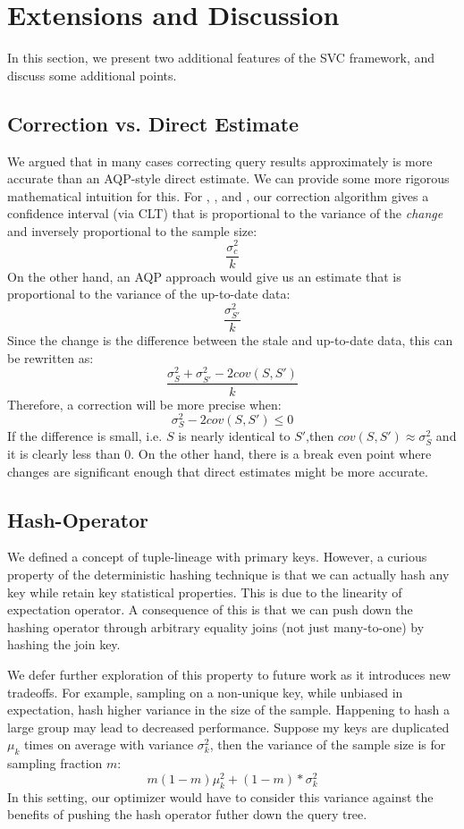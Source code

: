 
\section{Extensions and Discussion}\label{sec:ext}
In this section, we present two additional features of the SVC framework, and discuss some additional points.

\subsection{Correction vs. Direct Estimate}
We argued that in many cases correcting query results approximately is more accurate than an
AQP-style direct estimate. 
We can provide some more rigorous mathematical intuition for this.
For \sumfunc, \countfunc, and \avgfunc, our correction algorithm gives a confidence interval (via CLT) that is
proportional to the variance of the \emph{change} and inversely proportional to the sample size:
\[\frac{\sigma_{c}^2}{k}\]
On the other hand, an AQP approach would give us an estimate that is proportional to the variance of the up-to-date data:
\[\frac{\sigma_{S'}^2}{k}\]
Since the change is the difference between the stale and up-to-date data, this can be rewritten as: 
\[\frac{\sigma_{S}^2 + \sigma_{S'}^2 - 2cov(S,S')}{k}\]
Therefore, a correction will be more precise when:
\[\sigma_{S}^2 - 2cov(S,S') \le 0 \]
If the difference is small, i.e. $S$ is nearly identical to $S'$,then $cov(S,S') \approx \sigma_{S}^2$ and it is clearly less than 0.
On the other hand, there is a break even point where changes are significant enough that direct estimates might be more accurate.

\subsection{Hash-Operator}
We defined a concept of tuple-lineage with primary keys.
However, a curious property of the deterministic hashing technique is that we can actually hash any key while retain key
statistical properties.
This is due to the linearity of expectation operator.
A consequence of this is that we can push down the hashing operator through arbitrary equality joins (not just many-to-one) by hashing the join key.

We defer further exploration of this property to future work as it introduces new tradeoffs.
For example, sampling on a non-unique key, while unbiased in expectation, hash higher variance in the size of the sample.
Happening to hash a large group may lead to decreased performance. 
Suppose my keys are duplicated $\mu_k$ times on average with variance $\sigma_k^2$, then the variance of the
sample size is for sampling fraction $m$:
\[m(1-m)\mu_k^2+(1-m)*\sigma_k^2\]
In this setting, our optimizer would have to consider this variance against the benefits of pushing the hash operator futher down the query tree. 


